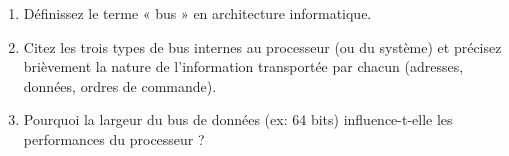 \documentclass[11pt]{article}
\begin{document}
\begin{exercice}
\begin{enumerate}
    \item Définissez le terme « bus » en architecture informatique.
    \item Citez les trois types de bus internes au processeur (ou du système) et précisez brièvement la nature de l'information transportée par chacun (adresses, données, ordres de commande).
    \item Pourquoi la largeur du bus de données (ex: 64 bits) influence-t-elle les performances du processeur ?
\end{enumerate}
\end{exercice}
\end{document}
